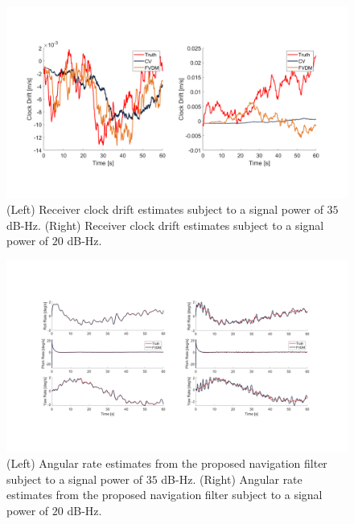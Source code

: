 \begin{figure}[!ht]
    \centering
    \includegraphics[width=\linewidth]{Figures/resultsv2/Slide4.PNG}
    \caption{(Left) Receiver clock drift estimates subject to a signal power of \(35\) dB-Hz. (Right) Receiver clock drift estimates subject to a signal power of \(20\) dB-Hz.}\label{fig:velocityerror221}
\end{figure}

\begin{figure}[!ht]
    \centering
    \includegraphics[width=\linewidth]{Figures/resultsv2/Slide9.PNG}
    \caption{(Left) Angular rate estimates from the proposed navigation filter subject to a signal power of \(35\) dB-Hz. (Right) Angular rate estimates from the proposed navigation filter subject to a signal power of \(20\) dB-Hz.}\label{fig:fixthis2}
\end{figure}

